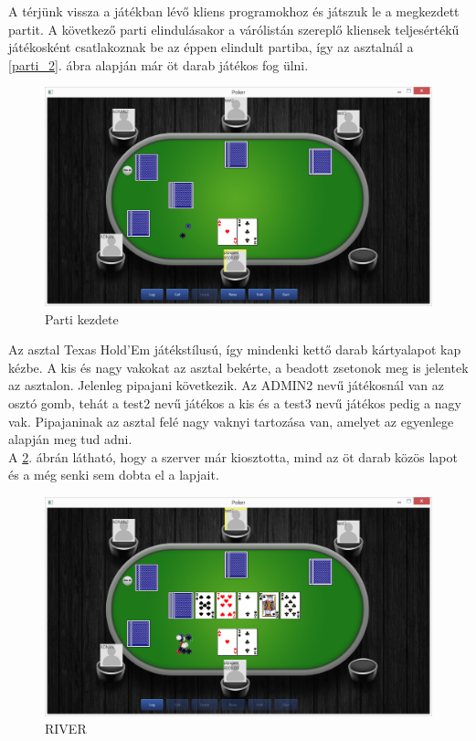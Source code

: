  A térjünk vissza a játékban lévő kliens programokhoz és játszuk le a megkezdett partit. A következő parti elindulásakor a várólistán szereplő kliensek teljesértékű játékosként csatlakoznak be az éppen elindult partiba, így az asztalnál a \ref{parti_2}. ábra alapján már öt darab játékos fog ülni.
 \begin{figure}[h!]
  \caption{Parti kezdete}
  \label{fig:parti_2}
  \centering
    \includegraphics[width=\textwidth]{user-documentation/images/parti/parti_2.jpg}
\end{figure}
Az asztal Texas Hold'Em játékstílusú, így mindenki kettő darab kártyalapot kap kézbe. A kis és nagy vakokat az asztal bekérte, a beadott zsetonok meg is jelentek az asztalon. Jelenleg pipajani következik. Az ADMIN2 nevű játékosnál van az osztó gomb, tehát a test2 nevű játékos a kis és a test3 nevű játékos pedig a nagy vak. Pipajaninak az asztal felé nagy vaknyi tartozása van, amelyet az egyenlege alapján meg tud adni. \\
A \ref{fig:parti_3}. ábrán látható, hogy a szerver már kiosztotta, mind az öt darab közös lapot és a még senki sem dobta el a lapjait.
 \begin{figure}[h!]
  \caption{RIVER}
  \label{fig:parti_3}
  \centering
    \includegraphics[width=\textwidth]{user-documentation/images/parti/parti_3.jpg}
\end{figure}
